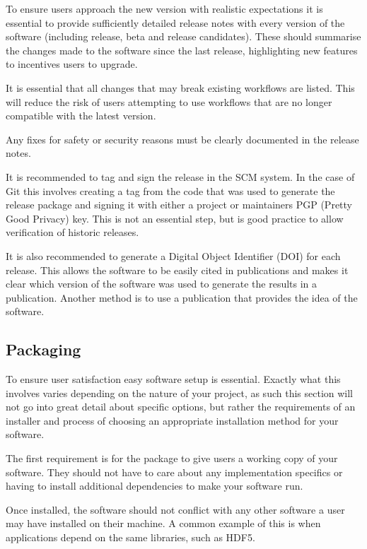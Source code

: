 \documentclass[jnr]{iosart2x}
\begin{document}
To ensure users approach the new version with realistic expectations it is essential to provide sufficiently detailed release notes with every version of the software (including release, beta and release candidates).
These should summarise the changes made to the software since the last release, highlighting new features to incentives users to upgrade.

It is essential that all changes that may break existing workflows are listed.
This will reduce the risk of users attempting to use workflows that are no longer compatible with the latest version.

Any fixes for safety or security reasons must be clearly documented in the release notes.

It is recommended to tag and sign the release in the SCM system. In the case of Git this involves creating a tag from the code that was used to generate the release package and signing it with either a project or maintainers PGP (Pretty Good Privacy) key.
This is not an essential step, but is good practice to allow verification of historic releases.

It is also recommended to generate a Digital Object Identifier (DOI) for each release.
This allows the software to be easily cited in publications and makes it clear which version of the software was used to generate the results in a publication.
Another method is to use a publication that provides the idea of the software.

\subsection{Packaging}
\label{Packaging}

To ensure user satisfaction easy software setup is essential.
Exactly what this involves varies depending on the nature of your project, as such this section will not go into great detail about specific options, but rather the requirements of an installer and process of choosing an appropriate installation method for your software.

The first requirement is for the package to give users a working copy of your software.
They should not have to care about any implementation specifics or having to install additional dependencies to make your software run.

Once installed, the software should not conflict with any other software a user may have installed on their machine.
A common example of this is when applications depend on the same libraries, such as HDF5.
\end{document}
